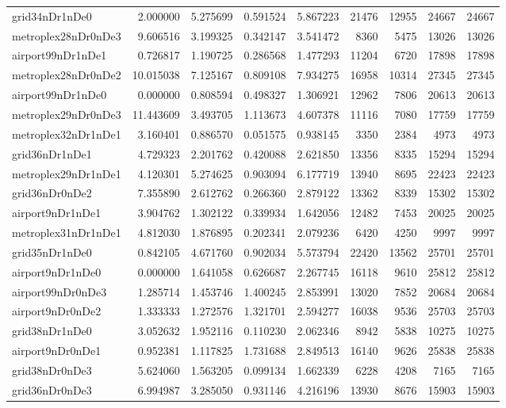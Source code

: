 \begin{longtable}{|l|r|r|r|r|r|r|r|r|}
grid34nDr1nDe0 & 2.000000 & 5.275699 & 0.591524 & 5.867223 & 21476 & 12955 & 24667 & 24667 \\
metroplex28nDr0nDe3 & 9.606516 & 3.199325 & 0.342147 & 3.541472 & 8360 & 5475 & 13026 & 13026 \\
airport99nDr1nDe1 & 0.726817 & 1.190725 & 0.286568 & 1.477293 & 11204 & 6720 & 17898 & 17898 \\
metroplex28nDr0nDe2 & 10.015038 & 7.125167 & 0.809108 & 7.934275 & 16958 & 10314 & 27345 & 27345 \\
airport99nDr1nDe0 & 0.000000 & 0.808594 & 0.498327 & 1.306921 & 12962 & 7806 & 20613 & 20613 \\
metroplex29nDr0nDe3 & 11.443609 & 3.493705 & 1.113673 & 4.607378 & 11116 & 7080 & 17759 & 17759 \\
metroplex32nDr1nDe1 & 3.160401 & 0.886570 & 0.051575 & 0.938145 & 3350 & 2384 & 4973 & 4973 \\
grid36nDr1nDe1 & 4.729323 & 2.201762 & 0.420088 & 2.621850 & 13356 & 8335 & 15294 & 15294 \\
metroplex29nDr1nDe1 & 4.120301 & 5.274625 & 0.903094 & 6.177719 & 13940 & 8695 & 22423 & 22423 \\
grid36nDr0nDe2 & 7.355890 & 2.612762 & 0.266360 & 2.879122 & 13362 & 8339 & 15302 & 15302 \\
airport9nDr1nDe1 & 3.904762 & 1.302122 & 0.339934 & 1.642056 & 12482 & 7453 & 20025 & 20025 \\
metroplex31nDr1nDe1 & 4.812030 & 1.876895 & 0.202341 & 2.079236 & 6420 & 4250 & 9997 & 9997 \\
grid35nDr1nDe0 & 0.842105 & 4.671760 & 0.902034 & 5.573794 & 22420 & 13562 & 25701 & 25701 \\
airport9nDr1nDe0 & 0.000000 & 1.641058 & 0.626687 & 2.267745 & 16118 & 9610 & 25812 & 25812 \\
airport99nDr0nDe3 & 1.285714 & 1.453746 & 1.400245 & 2.853991 & 13020 & 7852 & 20684 & 20684 \\
airport9nDr0nDe2 & 1.333333 & 1.272576 & 1.321701 & 2.594277 & 16038 & 9536 & 25703 & 25703 \\
grid38nDr1nDe0 & 3.052632 & 1.952116 & 0.110230 & 2.062346 & 8942 & 5838 & 10275 & 10275 \\
airport9nDr0nDe1 & 0.952381 & 1.117825 & 1.731688 & 2.849513 & 16140 & 9626 & 25838 & 25838 \\
grid38nDr0nDe3 & 5.624060 & 1.563205 & 0.099134 & 1.662339 & 6228 & 4208 & 7165 & 7165 \\
grid36nDr0nDe3 & 6.994987 & 3.285050 & 0.931146 & 4.216196 & 13930 & 8676 & 15903 & 15903 \\

\end{longtable}
